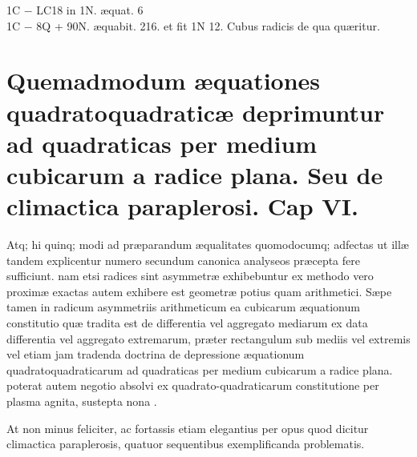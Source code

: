 \documentclass[11pt,a4paper]{article}
\begin{document}
1C $-$ LC18 in 1N. æquat. 6\\
1C $-$ 8Q + 90N. æquabit. 216. et fit 1N 12.
Cubus radicis de qua quæritur.

\section*{Quemadmodum æquationes quadratoquadraticæ deprimuntur ad quadraticas per medium cubicarum a radice plana. Seu de climactica paraplerosi. Cap VI.}

Atq; hi quinq; modi ad præparandum æqualitates quomodocumq; adfectas ut illæ tandem explicentur numero secundum canonica analyseos præcepta fere sufficiunt. nam etsi radices sint asymmetræ exhibebuntur ex methodo vero proximæ exactas autem exhibere est geometræ potius quam arithmetici. Sæpe tamen in radicum asymmetriis  arithmeticum ea cubicarum æquationum constitutio quæ tradita est de differentia vel aggregato mediarum ex data differentia vel aggregato extremarum, præter rectangulum sub mediis vel extremis vel etiam jam tradenda doctrina de depressione æquationum quadratoquadraticarum ad quadraticas per medium cubicarum a radice plana. poterat autem negotio absolvi ex quadrato-quadraticarum constitutione per plasma agnita, sustepta nona .


At non minus feliciter, ac fortassis etiam elegantius per opus quod dicitur climactica paraplerosis,  quatuor  sequentibus exemplificanda problematis.
\end{document}
